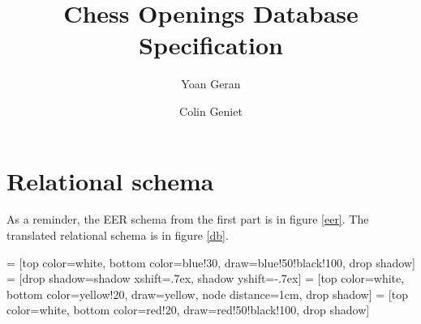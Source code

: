 \documentclass{article}
\begin{document}
\title{Chess Openings Database Specification}
\author{Yoan Geran \and Colin Geniet}
\maketitle

\tableofcontents

\section{Relational schema}
As a reminder, the EER schema from the first part is in figure \ref{eer}.
The translated relational schema is in figure \ref{db}.


 = [top color=white, bottom color=blue!30, 
                            draw=blue!50!black!100, drop shadow]
 = [drop shadow={shadow xshift=.7ex, 
                                 shadow yshift=-.7ex}]
 = [top color=white, bottom color=yellow!20, 
                               draw=yellow, node distance=1cm, drop shadow]
 = [top color=white, bottom color=red!20, 
                                  draw=red!50!black!100, drop shadow]
\end{document}
